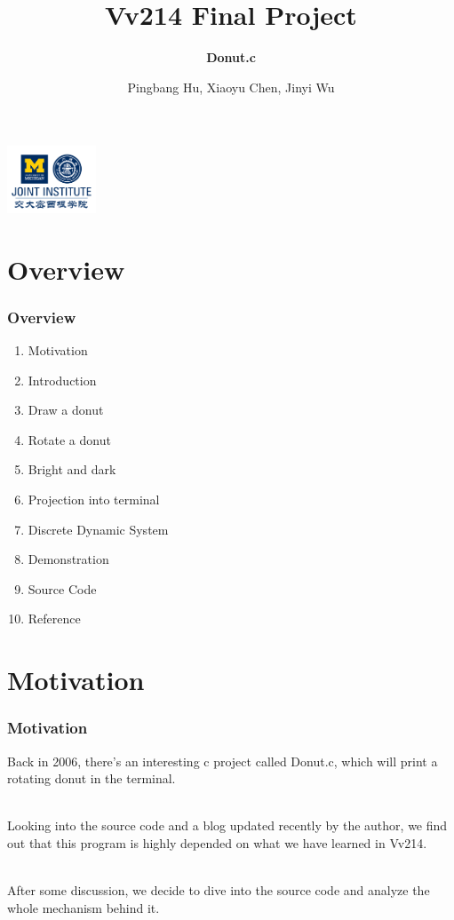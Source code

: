 \documentclass[12pt, t]{beamer}
\title{Vv214 Final Project}
\subtitle{\textbf{Donut.c}}
\institute[UM-SJTU JI]{University of Michigan-Shanghai Jiao Tong University Joint Institute}
\author{Pingbang Hu, Xiaoyu Chen, Jinyi Wu}
\newcommand{\nullspace}{~\\[15pt]}
\begin{document}
\begin{frame}
    \titlepage
    \begin{center}
        \includegraphics[height=2cm]{Figures/logo/logo2.png}
    \end{center}
\end{frame}

\section{Overview}
    \begin{frame}
        \frametitle{Overview}
        \begin{enumerate}
            \item Motivation
            \item Introduction
            \item Draw a donut
            \item Rotate a donut
            \item Bright and dark
            \item Projection into terminal
            \item Discrete Dynamic System
            \item Demonstration
            \item Source Code
            \item Reference
        \end{enumerate}
    \end{frame}


\section{Motivation}
\begin{frame}
    \frametitle{Motivation}

    Back in 2006, there's an interesting c project called Donut.c, which will print a rotating 
    donut in the terminal.

    \nullspace
    Looking into the source code and a blog updated recently by the author, we find out 
    that this program is highly depended on what we have learned in Vv214.

    \nullspace
    After some discussion, we decide to dive into the source code and analyze the whole mechanism 
    behind it.

\end{frame}
\end{document}

